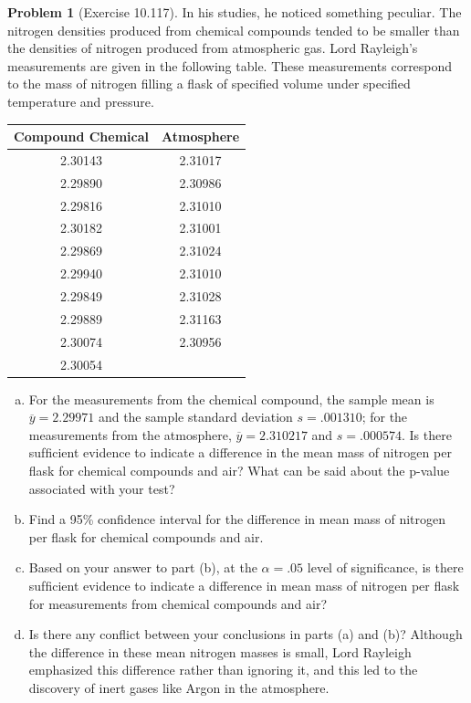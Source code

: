 \documentclass[10pt]{article}
\theoremstyle{definition}
\newtheorem{problem}[theorem]{Problem}
\newcommand{\1}[1]{\textbf{1}_{\left[#1\right]}} %
\begin{document}
\begin{problem}[Exercise 10.117]
  In his studies, he noticed something peculiar. The nitrogen densities
  produced from chemical compounds tended to be smaller than the densities of
  nitrogen produced from atmospheric gas. Lord Rayleigh's measurements are
  given in the following table. These measurements correspond to the mass of
  nitrogen filling a ﬂask of speciﬁed volume under specified temperature and
  pressure.
  \begin{center}
    \centering
    \begin{tabular}{cc}
      \hline
      \textbf{Compound Chemical} & \textbf{Atmosphere} \\
      \hline
      2.30143 & 2.31017 \\
      2.29890 & 2.30986 \\
      2.29816 & 2.31010 \\
      2.30182 & 2.31001 \\
      2.29869 & 2.31024 \\
      2.29940 & 2.31010 \\
      2.29849 & 2.31028 \\
      2.29889 & 2.31163 \\
      2.30074 & 2.30956 \\
      2.30054 &         \\
      \hline
    \end{tabular} 
  \end{center}
  \begin{enumerate}[(a)]
    \item For the measurements from the chemical compound, the sample mean is
    $\overline{y} = 2.29971$ and the sample standard deviation $s = .001310$;
    for the measurements from the atmosphere, $\overline{y} = 2.310217$ and
    $s = .000574$. Is there sufﬁcient evidence to indicate a difference in the
    mean mass of nitrogen per ﬂask for chemical compounds and air? What can be
    said about the p-value associated with your test?
    \item Find a 95\% conﬁdence interval for the difference in mean mass of
    nitrogen per ﬂask for chemical compounds and air.
    \item Based on your answer to part (b), at the $\alpha = .05$ level of
    signiﬁcance, is there sufﬁcient evidence to indicate a difference in mean
    mass of nitrogen per ﬂask for measurements from chemical compounds and
    air?
    \item Is there any conﬂict between your conclusions in parts (a) and (b)?
    Although the difference in these mean nitrogen masses is small, Lord
    Rayleigh emphasized this difference rather than ignoring it, and this led
    to the discovery of inert gases like Argon in the atmosphere.
  \end{enumerate}
\end{problem}
\end{document}
